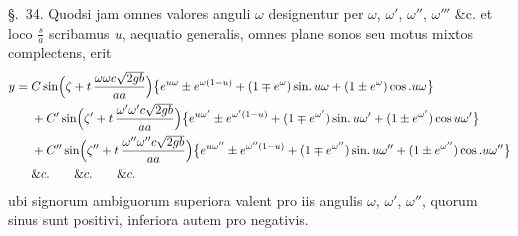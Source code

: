 \documentclass[11pt,a4paper]{article}
\begin{document}
§.~34. Quodsi jam omnes valores anguli $\omega$ designentur per $\omega$, $\omega'$,
$\omega''$, $\omega'''$ \&c. et loco $\frac{s}{a}$ scribamus \emph{u}, aequatio
generalis, omnes plane sonos seu motus mixtos complectens, erit
\begin{align}
y ={}& C\,\text{sin}\Bigl(\zeta + t\,\frac{\omega\omega c\sqrt{2gb}}{aa}\Bigr)\bigl\{e^{u\omega} \pm e^{\omega(1-u)} + (1 \mp e^\omega)\,\text{sin.}\,u\omega + (1 \pm e^\omega)\cos.u\omega\bigr\}\\
&+ C'\,\text{sin}\Bigl(\zeta' + t\,\frac{\omega'\omega'c\sqrt{2gb}}{aa}\Bigr)\bigl\{e^{u\omega'} \pm e^{\omega'(1-u)} + (1 \mp e^{\omega'})\,\text{sin.}\,u\omega' + (1 \pm e^{\omega'})\cos u\omega'\bigr\}\\
&+ C''\,\text{sin}\Bigl(\zeta'' + t\,\frac{\omega''\omega''c\sqrt{2gb}}{aa}\Bigr)\bigl\{e^{u\omega''} \pm e^{\omega''(1-u)} + (1 \mp e^{\omega''})\,\text{sin.}\,u\omega'' + (1 \pm e^{\omega''})\cos.u\omega''\bigr\}\\
&\&c. \qquad \&c. \qquad \&c.
\end{align}
ubi signorum ambiguorum superiora valent pro iis angulis $\omega$, $\omega'$,
$\omega''$, quorum sinus sunt positivi, inferiora autem pro negativis.
\end{document}
